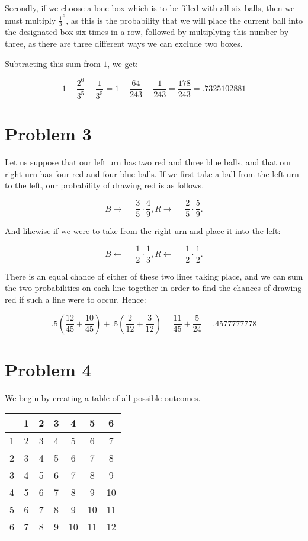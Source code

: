 \documentclass[12pt]{article}
\begin{document}
Secondly, if we choose a lone box which is to be filled with all six balls, then we must multiply $\frac{1}{3}^6$, as this is the probability that we will place the current ball into the designated box six times in a row, followed by multiplying this number by three, as there are three different ways we can exclude two boxes.

Subtracting this sum from $1$, we get:

\[
1 - \frac{2^6}{3^5} - \frac{1}{3^5} = 1 - \frac{64}{243} - \frac{1}{243} = \frac{178}{243} = .7325102881
\]

\section*{Problem 3}

Let us suppose that our left urn has two red and three blue balls, and that our right urn has four red and four blue balls. If we first take a ball from the left urn to the left, our probability of drawing red is as follows.

\[
B \rightarrow = \frac{3}{5} \cdot \frac{4}{9}, R \rightarrow = \frac{2}{5} \cdot \frac{5}{9}.
\]

And likewise if we were to take from the right urn and place it into the left:

\[
B \leftarrow = \frac{1}{2} \cdot \frac{1}{3}, R \leftarrow = \frac{1}{2} \cdot \frac{1}{2}.
\]

There is an equal chance of either of these two lines taking place, and we can sum the two probabilities on each line together in order to find the chances of drawing red if such a line were to occur. Hence:

\[
.5 \left( \frac{12}{45} + \frac{10}{45} \right) + .5 \left( \frac{2}{12} + \frac{3}{12} \right) = \frac{11}{45} + \frac{5}{24} = .4577777778
\]


\section*{Problem 4}
We begin by creating a table of all possible outcomes.
\begin{tabular}{ c || c | c | c | c | c | c }
& 1 & 2 & 3 & 4 & 5 & 6 \\
\hline
\hline
1 & 2 & 3 & 4 & 5 & 6 & 7 \\
\hline
2 & 3 & 4 & 5 & 6 & 7 & 8 \\
\hline
3 & 4 & 5 & 6 & 7 & 8 & 9 \\
\hline
4 & 5 & 6 & 7 & 8 & 9 & 10 \\
\hline
5 & 6 & 7 & 8 & 9 & 10 & 11 \\
\hline
6 & 7 & 8 & 9 & 10 & 11 & 12 \\
\end{tabular}
\end{document}
